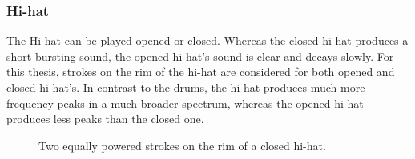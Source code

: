 \newpage
\subsubsection{Hi-hat}

The Hi-hat can be played opened or closed. Whereas the closed hi-hat produces a short bursting sound, the opened hi-hat's sound is clear and decays slowly. For this thesis, strokes on the rim of the hi-hat are considered for both opened and closed hi-hat's. In contrast to the drums, the hi-hat produces much more frequency peaks in a much broader spectrum, whereas the opened hi-hat produces less peaks than the closed one.

\begin{figure}[hbp]
	\centering
	\caption{Two equally powered strokes on the rim of a closed hi-hat.}
	\label{fig:hihat1}
\end{figure}

